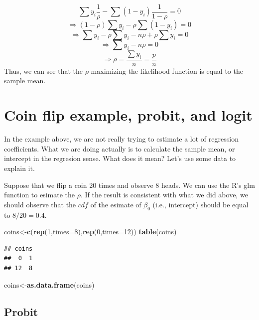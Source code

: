 \documentclass[]{book}
\newenvironment{Shaded}{\begin{snugshade}}{\end{snugshade}}
\newcommand{\DataTypeTok}[1]{\textcolor[rgb]{0.13,0.29,0.53}{#1}}
\newcommand{\DecValTok}[1]{\textcolor[rgb]{0.00,0.00,0.81}{#1}}
\newcommand{\KeywordTok}[1]{\textcolor[rgb]{0.13,0.29,0.53}{\textbf{#1}}}
\newcommand{\NormalTok}[1]{#1}
\begin{document}
\[\sum y_i \frac{1}{\rho}-\sum(1-y_i) \frac{1}{1-\rho}=0\]
\[\Rightarrow (1-\rho)\sum y_i - \rho \sum(1-y_i) =0\]
\[\Rightarrow \sum y_i-\rho\sum y_i - n\rho +\rho\sum y_i =0\]
\[\Rightarrow \sum y_i - n\rho  =0\]
\[\Rightarrow \rho  = \frac{\sum y_i}{n}=\frac{p}{n}\]
Thus, we can see that the \(\rho\) maximizing the likelihood function is equal to the sample mean.

\hypertarget{coin-flip-example-probit-and-logit}{%
\section{Coin flip example, probit, and logit}\label{coin-flip-example-probit-and-logit}}

In the example above, we are not really trying to estimate a lot of regression coefficients. What we are doing actually is to calculate the sample mean, or intercept in the regresion sense. What does it mean? Let's use some data to explain it.

Suppose that we flip a coin 20 times and observe 8 heads. We can use the R's glm function to esimate the \(\rho\). If the result is consistent with what we did above, we should observe that the \(cdf\) of the esimate of \(\beta_0\) (i.e., intercept) should be equal to \(8/20=0.4\).

\begin{Shaded}
\begin{Highlighting}[]
\NormalTok{coins<-}\KeywordTok{c}\NormalTok{(}\KeywordTok{rep}\NormalTok{(}\DecValTok{1}\NormalTok{,}\DataTypeTok{times=}\DecValTok{8}\NormalTok{),}\KeywordTok{rep}\NormalTok{(}\DecValTok{0}\NormalTok{,}\DataTypeTok{times=}\DecValTok{12}\NormalTok{))}
\KeywordTok{table}\NormalTok{(coins)}
\end{Highlighting}
\end{Shaded}

\begin{verbatim}
## coins
##  0  1 
## 12  8
\end{verbatim}

\begin{Shaded}
\begin{Highlighting}[]
\NormalTok{coins<-}\KeywordTok{as.data.frame}\NormalTok{(coins)}
\end{Highlighting}
\end{Shaded}

\hypertarget{probit-1}{%
\subsection{Probit}\label{probit-1}}
\end{document}
